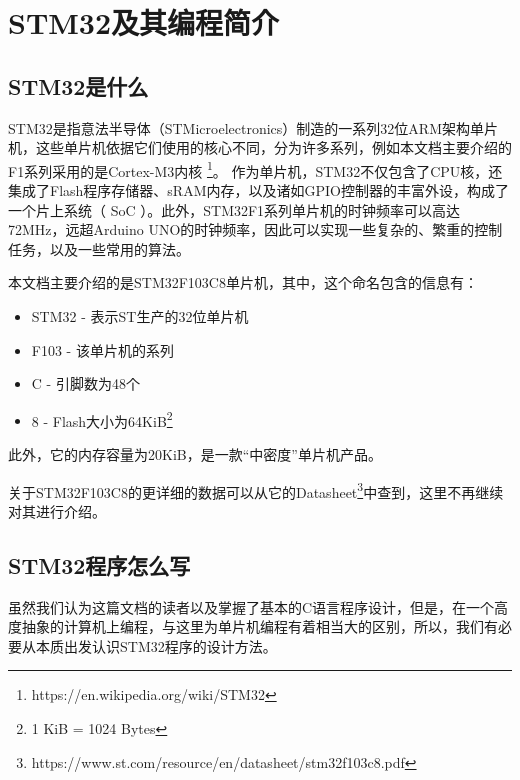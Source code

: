 \chapter{STM32及其编程简介}

\section{STM32是什么}
STM32是指意法半导体（STMicroelectronics）制造的一系列32位ARM架构单片机，这些单片机依据它们使用的核心不同，分为许多系列，例如本文档主要介绍的F1系列采用的是Cortex-M3内核 \footnote{https://en.wikipedia.org/wiki/STM32}。
作为单片机，STM32不仅包含了CPU核，还集成了Flash程序存储器、sRAM内存，以及诸如GPIO控制器的丰富外设，构成了一个片上系统（
\ac{SoC}
）。此外，STM32F1系列单片机的时钟频率可以高达72MHz，远超Arduino UNO的时钟频率，因此可以实现一些复杂的、繁重的控制任务，以及一些常用的算法。
\par 
本文档主要介绍的是STM32F103C8单片机，其中，这个命名包含的信息有：
\begin{itemize}
	\item STM32 - 表示ST生产的32位单片机
	\item F103 - 该单片机的系列
	\item C - 引脚数为48个
	\item 8 - Flash大小为64KiB\footnote{1 KiB = 1024 Bytes}
\end{itemize}
此外，它的内存容量为20KiB，是一款“中密度”单片机产品。
\par 
关于STM32F103C8的更详细的数据可以从它的Datasheet\footnote{https://www.st.com/resource/en/datasheet/stm32f103c8.pdf}中查到，这里不再继续对其进行介绍。

\section{STM32程序怎么写}
虽然我们认为这篇文档的读者以及掌握了基本的C语言程序设计，但是，在一个高度抽象的计算机上编程，与这里为单片机编程有着相当大的区别，所以，我们有必要从本质出发认识STM32程序的设计方法。

